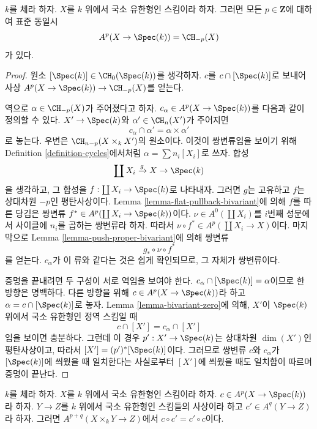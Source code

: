 \begin{lemma}
\label{lemma-chow-cohomology-towards-point}
$k$를 체라 하자. $X$를 $k$ 위에서 국소 유한형인 스킴이라 하자.
그러면 모든 $p \in \mathbf{Z}$에 대하여 표준 동일시
$$
A^p(X \to \Spec(k)) = \CH_{-p}(X)
$$
가 있다.
\end{lemma}

\begin{proof}
원소 $[\Spec(k)] \in \CH_0(\Spec(k))$를 생각하자. $c$를
$c \cap [\Spec(k)]$로 보내어 사상
$A^p(X \to \Spec(k)) \to \CH_{-p}(X)$를 얻는다.

\medskip\noindent
역으로 $\alpha \in \CH_{-p}(X)$가 주어졌다고 하자.
$c_\alpha \in A^p(X \to \Spec(k))$를 다음과 같이 정의할 수 있다.
$X' \to \Spec(k)$와 $\alpha' \in \CH_n(X')$가 주어지면
$$
c_\alpha \cap \alpha' = \alpha \times \alpha'
$$
로 놓는다. 우변은 $\CH_{n - p}(X \times_k X')$의 원소이다. 이것이
쌍변류임을 보이기 위해 Definition \ref{definition-cycles}에서처럼
$\alpha = \sum n_i[X_i]$로 쓰자. 합성
$$
\coprod X_i \xrightarrow{g} X \to \Spec(k)
$$
을 생각하고, 그 합성을 $f : \coprod X_i \to \Spec(k)$로 나타내자.
그러면 $g$는 고유하고 $f$는 상대차원 $-p$인 평탄사상이다. Lemma
\ref{lemma-flat-pullback-bivariant}에 의해 $f$를 따른 당김은 쌍변류
$f^* \in A^p(\coprod X_i \to \Spec(k))$이다.
$\nu \in A^0(\coprod X_i)$를 $i$번째 성분에서 사이클에 $n_i$를 곱하는
쌍변류라 하자. 따라서
$\nu \circ f^* \in A^p(\coprod X_i \to X)$이다.
마지막으로 Lemma \ref{lemma-push-proper-bivariant}에 의해 쌍변류
$$
g_* \circ \nu \circ f^*
$$
를 얻는다. $c_\alpha$가 이 류와 같다는 것은 쉽게 확인되므로,
그 자체가 쌍변류이다.

\medskip\noindent
증명을 끝내려면 두 구성이 서로 역임을 보여야 한다.
$c_\alpha \cap [\Spec(k)] = \alpha$이므로 한 방향은 명백하다.
다른 방향을 위해 $c \in A^p(X \to \Spec(k))$라 하고
$\alpha = c \cap [\Spec(k)]$로 놓자. Lemma
\ref{lemma-bivariant-zero}에 의해, $X'$이 $\Spec(k)$ 위에서 국소
유한형인 정역 스킴일 때
$$
c \cap [X'] = c_\alpha \cap [X']
$$
임을 보이면 충분하다. 그런데 이 경우 $p' : X' \to \Spec(k)$는
상대차원 $\dim(X')$인 평탄사상이고, 따라서
$[X'] = (p')^*[\Spec(k)]$이다. 그러므로 쌍변류 $c$와 $c_\alpha$가
$[\Spec(k)]$에 씌웠을 때 일치한다는 사실로부터 $[X']$에 씌웠을 때도
일치함이 따르며 증명이 끝난다.
\end{proof}

\begin{lemma}
\label{lemma-chow-cohomology-towards-point-commutes}
$k$를 체라 하자. $X$를 $k$ 위에서 국소 유한형인 스킴이라 하자.
$c \in A^p(X \to \Spec(k))$라 하자. $Y \to Z$를 $k$ 위에서 국소
유한형인 스킴들의 사상이라 하고 $c' \in A^q(Y \to Z)$라 하자.
그러면 $A^{p + q}(X \times_k Y \to Z)$에서
$c \circ c' = c' \circ c$이다.
\end{lemma}

